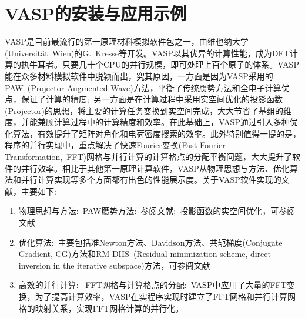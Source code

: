 \setcounter{chapter}{10}
\chapter{VASP的安装与应用示例}\label{chap:VASP_train}
\textrm{VASP}是目前最流行的第一原理材料模拟软件包之一，由维也纳大学\textrm{(Universit\"at~Wien)}的\textrm{G.~Kresse}等开发。\cite{VASP_manual}\textrm{VASP}以其优异的计算性能，成为\textrm{DFT}计算的执牛耳者。\cite{CPC177-6_2007}只要几十个\textrm{CPU}的并行规模，即可处理上百个原子的体系。\textrm{VASP}能在众多材料模拟软件中脱颖而出，究其原因，一方面是因为\textrm{VASP}采用的\textrm{PAW~(Projector Augmented-Wave)}方法\cite{PRB50-17953_1994,PRB59-1758_1999}，平衡了传统赝势方法和全电子计算优点，保证了计算的精度;~另一方面是在计算过程中采用实空间优化的投影函数\textrm{(Projector)}的思想，将主要的计算任务变换到实空间完成，大大节省了基组的维度，并能兼顾计算过程中的计算精度和效率。在此基础上，\textrm{VASP}通过引入多种优化算法，有效提升了矩阵对角化和电荷密度搜索的效率。此外特别值得一提的是，程序的并行实现中，重点解决了快速\textrm{Fourier}变换\textrm{(Fast Fourier Transformation,~FFT)}网格与并行计算的计算格点的分配平衡问题，大大提升了软件的并行效率。相比于其他第一原理计算软件，\textrm{VASP}从物理思想与方法、优化算法和并行计算实现等多个方面都有出色的性能展示度。关于\textrm{VASP}软件实现的文献，主要如下:~
\begin{enumerate}
	\item 物理思想与方法:~\textrm{PAW}赝势方法:~参阅文献;~投影函数的实空间优化，可参阅文献
	\item 优化算法:~主要包括准\textrm{Newton}方法、\textrm{Davidson}方法、共轭梯度(\textrm{Conjugate Gradient, CG})方法和\textrm{RM-DIIS~(Residual minimization scheme, direct inversion in the iterative subspace)}方法，可参阅文献
	\item 高效的并行计算:~ \textrm{FFT}网格与计算格点的分配:~\textrm{VASP}中应用了大量的\textrm{FFT}变换，为了提高计算效率，\textrm{VASP}在实程序实现时建立了\textrm{FFT}网格和并行计算网格的映射关系，实现\textrm{FFT}网格计算的并行化。 %
\end{enumerate}

